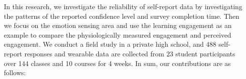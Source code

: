\documentclass[sigconf]{acmart}
\begin{document}




In this research, we investigate the reliability of self-report data by investigating the patterns of the reported confidence level and survey completion time. Then we focus on the emotion sensing area and use the learning engagement as an example to compare the physiologically measured engagement and perceived engagement. We conduct a field study in a private high school, and 488 self-report responses and wearable data are collected from 23 student participants over 144 classes and 10 courses for 4 weeks. In sum, our contributions are as follows:
\end{document}
